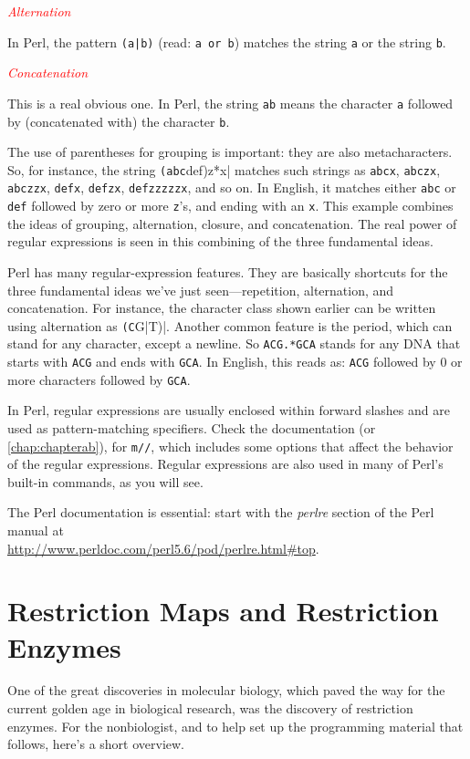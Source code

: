 \textcolor{red}{\textit{Alternation}}
\begin{adjustwidth}{2em}{}
In Perl, the pattern \verb=(a|b)= (read: \verb|a or b|) matches the string \verb|a| or the string \verb|b|.
\end{adjustwidth}

\textcolor{red}{\textit{Concatenation}}
\begin{adjustwidth}{2em}{}
This is a real obvious one. In Perl, the string \verb|ab| means the character \verb|a| followed by (concatenated with) the character \verb|b|.
\end{adjustwidth}

The use of parentheses for grouping is important: they are also metacharacters. So, for instance, the string \verb|(abc|def)z*x| matches such strings as \verb|abcx|, \verb|abczx|, \verb|abczzx|, \verb|defx|, \verb|defzx|, \verb|defzzzzzx|, and so on. In English, it matches either \verb|abc| or \verb|def| followed by zero or more \verb|z|'s, and ending with an \verb|x|. This example combines the ideas of grouping, alternation, closure, and concatenation. The real power of regular expressions is seen in this combining of the three fundamental ideas. 

Perl has many regular-expression features. They are basically shortcuts for the three fundamental ideas we've just seen—repetition, alternation, and concatenation. For instance, the character class shown earlier can be written using alternation as \verb|(C|G|T)|. Another common feature is the period, which can stand for any character, except a newline. So \verb|ACG.*GCA| stands for any DNA that starts with \verb|ACG| and ends with \verb|GCA|. In English, this reads as: \verb|ACG| followed by 0 or more characters followed by \verb|GCA|. 

In Perl, regular expressions are usually enclosed within forward slashes and are used as pattern-matching specifiers. Check the documentation (or \autoref{chap:chapterab}), for \verb|m//|, which includes some options that affect the behavior of the regular expressions. Regular expressions are also used in many of Perl's built-in commands, as you will see.

The Perl documentation is essential: start with the \textit{perlre} section of the Perl manual at\\
\href{http://www.perldoc.com/perl5.6/pod/perlre.html\#top}{http://www.perldoc.com/perl5.6/pod/perlre.html\#top}. 

\section{Restriction Maps and Restriction Enzymes}
One of the great discoveries in molecular biology, which paved the way for the current golden age in biological research, was the discovery of restriction enzymes. For the nonbiologist, and to help set up the programming material that follows, here's a short overview. 


